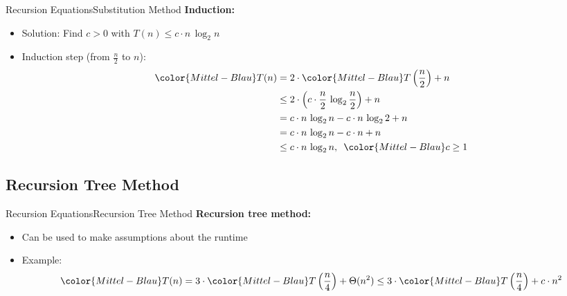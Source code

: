 
\begin{frame}{Recursion Equations}{Substitution Method}
  \textbf{Induction:}
  \begin{itemize}
    \item
      Solution: Find {\color{Mittel-Blau}$c > 0$} with
      {\color{Mittel-Blau}$T(n) \leq c \cdot n \, \log_2 n$}
    \item
      Induction step (from {\color{Mittel-Blau}$\frac{n}{2}$} to
      {\color{Mittel-Blau}$n$}):
      \begin{align*}
        {\color{Mittel-Blau}T(n)} & =
          2 \cdot {\color{Mittel-Blau}T\left(\dfrac{n}{2}\right)} + n\\
        {} & \leq 2 \cdot \left(
          c \cdot \dfrac{n}{2} \, \log_2 \dfrac{n}{2}\right) + n\\
        {} & = c \cdot n \, \log_2 n - c \cdot n \, \log_2 2 + n\\
        {} & = c \cdot n \, \log_2 n - c \cdot n + n\\
        {} & \leq c \cdot n \, \log_2 n,
          \hspace{0.5em} {\color{Mittel-Blau}c \geq 1}
      \end{align*}
  \end{itemize}
\end{frame}


\subsection{Recursion Tree Method}

\begin{frame}{Recursion Equations}{Recursion Tree Method}
  \textbf{Recursion tree method:}
  \begin{itemize}
    \item<2->
      Can be used to make assumptions about the runtime
    \item<3->
      Example:\\
      \begin{displaymath}
        {\color{Mittel-Blau}T(n)}
        = 3 \cdot {\color{Mittel-Blau}T\left(\dfrac{n}{4}\right)} + \Theta(n^2)
        \leq 3 \cdot {\color{Mittel-Blau}T\left(\dfrac{n}{4}\right)} + c \cdot 
        n^2
      \end{displaymath}
  \end{itemize}
\end{frame}

